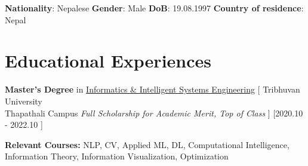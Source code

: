 \documentclass{resume}
\begin{document}

\ResumeTitle


\begin{center}  
\vspace{-2mm}
\textbf{Nationality}: Nepalese \quad \textbf{Gender}: Male \quad \textbf{DoB}: 19.08.1997 \quad \textbf{Country of residence}: Nepal
\end{center}

\section{Educational Experiences}
\ResumeItem
{\textbf{Master's Degree} 
 in \href{https://tcioe.edu.np/page/MSIISE}{Informatics \& Intelligent Systems Engineering}}
[  Tribhuvan University \\
Thapathali Campus \qquad \textit{Full Scholarship for Academic Merit, Top of Class}
]
[2020.10 - 2022.10 ]

\textbf{Relevant Courses:} NLP, CV, Applied ML, DL, Computational Intelligence, Information Theory, Information Visualization, Optimization 
\end{document}
